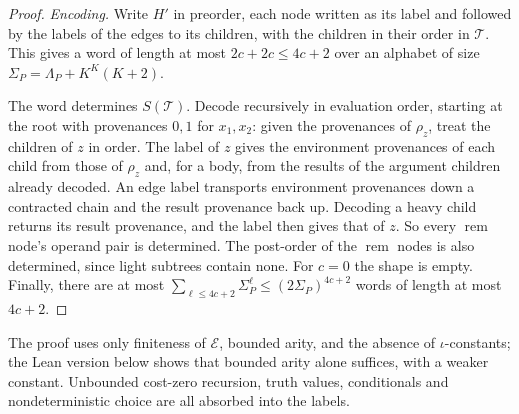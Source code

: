 \documentclass[11pt]{article}
\theoremstyle{remark}
\newcommand{\rem}{\operatorname{rem}}
\begin{document}
\begin{proof}
\emph{Encoding.} Write $H'$ in preorder, each node written as its label and
followed by the labels of the edges to its children, with the children in
their order in $\mathcal T$. This gives a word of length at most
$2c+2c\leq4c+2$ over an alphabet of size $\Sigma_P=\Lambda_P+K^K(K+2)$.

The word determines $S(\mathcal T)$. Decode recursively in evaluation order,
starting at the root with provenances $0,1$ for $x_1,x_2$: given the
provenances of $\rho_z$, treat the children of $z$ in order. The label of $z$
gives the environment provenances of each child from those of $\rho_z$ and,
for a body, from the results of the argument children already decoded. An
edge label transports environment provenances down a contracted chain and the
result provenance back up. Decoding a heavy child returns its result
provenance, and the label then gives that of $z$. So every $\rem$ node's
operand pair is determined. The post-order of the $\rem$ nodes is also
determined, since light subtrees contain none. For $c=0$ the shape is empty.
Finally, there are at most $\sum_{\ell\leq4c+2}\Sigma_P^\ell\leq(2\Sigma_P)^{4c+2}$
words of length at most $4c+2$.
\end{proof}

The proof uses only finiteness of $\mathcal E$, bounded arity, and the
absence of $\iota$-constants; the Lean version below shows that bounded arity
alone suffices, with a weaker constant. Unbounded cost-zero recursion, truth values,
conditionals and nondeterministic choice are all absorbed into the labels.
\end{document}
